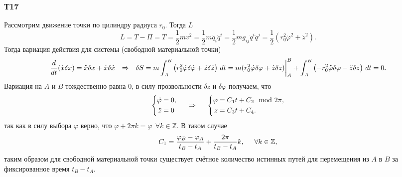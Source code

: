 \subsubsection*{Т17}

Рассмотрим движение точки по цилиндру радиуса $r_0$. Тогда $L$ 
\begin{equation*}
    L  = T - \Pi = T = \frac{1}{2} m v^2 = \frac{1}{2} m \dot{q}_i \dot{q}^i
    = \frac{1}{2} m g_{ij} \dot{q}^i \dot{q}^j
    = \frac{1}{2} \left(r_0^2 \dot{\varphi}^2 + \dot{z}^2\right)
    .
\end{equation*}
Тогда вариация действия для системы (свободной материальной точки)
\begin{equation*}
    \frac{d }{d t} (\dot{x} \delta x) = \ddot{x} \delta x + \dot{x} \delta \dot{x}
    \hspace{0.25cm} \Rightarrow \hspace{0.25cm} 
    \delta S =
    m \int_A^B 
    \left( 
        r_0^2 \dot{\varphi} \delta \dot{\varphi} + \dot{z} \delta \dot{z}
     \right)
    \, d t = 
    m (r_0^2 \dot{\varphi} \delta \varphi + \dot{z} \delta z)\bigg|_A^B
    + 
    \int_A^B 
    \left(
        -r_0^2 \ddot{\varphi} \delta \varphi - \ddot{z} \delta z
    \right) \, d t = 0.
\end{equation*}
Вариация на $A$ и $B$ тождественно равна 0, в силу прозвольности $\delta z$ и $\delta \varphi$ получаем, что
\begin{equation*}
    \left\{\begin{aligned}
        \ddot{\varphi} &= 0, \\
        \ddot{z} &= 0
    \end{aligned}\right.
    \hspace{0.5cm} \Rightarrow \hspace{0.5cm} 
    \left\{\begin{aligned}
        \varphi &= C_1 t + C_2 \mod 2 \pi, \\
        z &= C_3 t + C_4.
    \end{aligned}\right.
\end{equation*}
так как в силу выбора $\varphi$ верно, что $\varphi + 2 \pi k = \varphi \ \  \forall k \in \mathbb{Z}$. В таком случае
\begin{equation*}
    C_1 = \frac{\varphi_B - \varphi_A}{t_B - t_A} + \frac{2\pi}{t_B - t_A} k,
    \hspace{0.5cm} \forall k \in \mathbb{Z},
\end{equation*}
таким образом для свободной материальной точки существует счётное количество истинных путей для перемещения из $A$ в $B$ за фиксированное время $t_B - t_A$.
